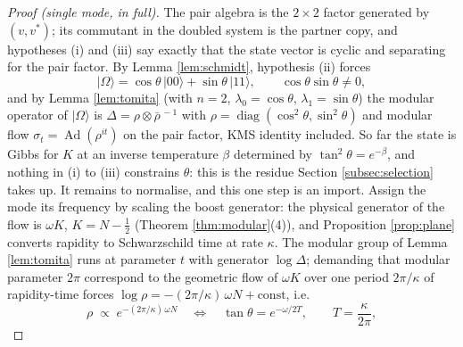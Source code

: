 \documentclass[11pt]{article}
\theoremstyle{definition}
\begin{document}
\begin{proof}[Proof (single mode, in full)]
The pair algebra is the $2 \times 2$ factor generated by $(v, v^*)$; its commutant in the doubled system is the partner copy, and hypotheses (i) and (iii) say exactly that the state vector is cyclic and separating for the pair factor. By Lemma \ref{lem:schmidt}, hypothesis (ii) forces
\[
|\Omega\rangle = \cos\theta\,|00\rangle + \sin\theta\,|11\rangle, \qquad \cos\theta\sin\theta \neq 0 ,
\]
and by Lemma \ref{lem:tomita} (with $n = 2$, $\lambda_0 = \cos\theta$, $\lambda_1 = \sin\theta$) the modular operator of $|\Omega\rangle$ is $\Delta = \rho \otimes \bar\rho^{\,-1}$ with $\rho = \operatorname{diag}(\cos^2\theta, \sin^2\theta)$ and modular flow $\sigma_t = \operatorname{Ad}(\rho^{it})$ on the pair factor, KMS identity included. So far the state is Gibbs for $K$ at an inverse temperature $\beta$ determined by $\tan^{2}\theta = e^{-\beta}$, and nothing in (i) to (iii) constrains $\theta$: this is the residue Section \ref{subsec:selection} takes up. It remains to normalise, and this one step is an import. Assign the mode its frequency by scaling the boost generator: the physical generator of the flow is $\omega K$, $K = N - \tfrac12$ (Theorem \ref{thm:modular}(4)), and Proposition \ref{prop:plane} converts rapidity to Schwarzschild time at rate $\kappa$. The modular group of Lemma \ref{lem:tomita} runs at parameter $t$ with generator $\log\Delta$; demanding that modular parameter $2\pi$ correspond to the geometric flow of $\omega K$ over one period $2\pi/\kappa$ of rapidity-time forces $\log\rho = -(2\pi/\kappa)\,\omega N + \text{const}$, i.e.
\[
\rho \;\propto\; e^{-(2\pi/\kappa)\,\omega N}
\quad\Longleftrightarrow\quad
\tan\theta = e^{-\omega/2T}, \qquad T = \frac{\kappa}{2\pi} ,
\]

\end{proof}
\end{document}
